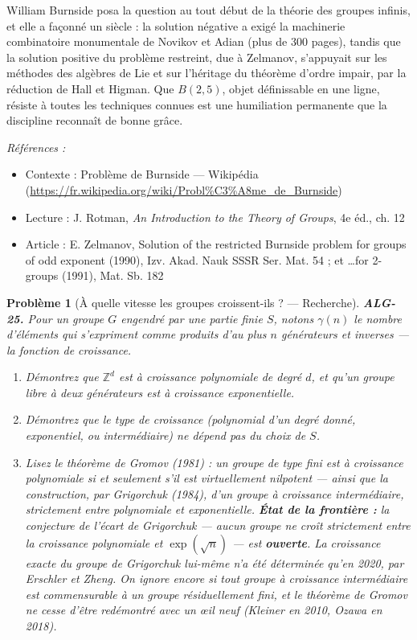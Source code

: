\documentclass[11pt]{article}
\newtheorem{problem}{Problème}
\newenvironment{refs}{\par\small\noindent\emph{Références :}\begin{itemize}\setlength\itemsep{0pt}}{\end{itemize}\normalsize}
\begin{document}
\noindent William Burnside posa la question au tout début de la théorie des groupes infinis, et
elle a façonné un siècle : la solution négative a exigé la machinerie combinatoire monumentale de Novikov et
Adian (plus de 300 pages), tandis que la solution positive du problème restreint, due à Zelmanov, s'appuyait
sur les méthodes des algèbres de Lie et sur l'héritage du théorème d'ordre impair, par la réduction de Hall
et Higman. Que $B(2,5)$, objet définissable en une ligne, résiste à toutes les techniques connues est une
humiliation permanente que la discipline reconnaît de bonne grâce.

\begin{refs}
\item Contexte : Problème de Burnside --- Wikipédia (\url{https://fr.wikipedia.org/wiki/Probl%C3%A8me_de_Burnside})
\item Lecture : J. Rotman, \textit{An Introduction to the Theory of Groups}, 4e éd., ch. 12
\item Article : E. Zelmanov, \og{} Solution of the restricted Burnside problem for groups of odd exponent \fg{} (1990), Izv. Akad. Nauk SSSR Ser. Mat. 54 ; et \og{} \dots{}for 2-groups \fg{} (1991), Mat. Sb. 182
\end{refs}

\bigskip

\begin{problem}[{À quelle vitesse les groupes croissent-ils ? --- Recherche}]
\textbf{ALG-25.} Pour un groupe $G$ engendré par une partie finie $S$, notons
$\gamma(n)$ le nombre d'éléments qui s'expriment comme produits d'au plus $n$ générateurs et
inverses --- la \textit{fonction de croissance}.
\begin{enumerate}
\item[(i)] Démontrez que $\mathbb{Z}^d$ est à croissance polynomiale
de degré $d$, et qu'un groupe libre à deux générateurs est à croissance exponentielle.
\item[(ii)] Démontrez que
le type de croissance (polynomial d'un degré donné, exponentiel, ou intermédiaire) ne dépend pas du
choix de $S$.
\item[(iii)] Lisez le théorème de Gromov (1981) : un groupe de type fini est à croissance
polynomiale si et seulement s'il est virtuellement nilpotent --- ainsi que la construction, par Grigorchuk
(1984), d'un groupe à croissance \textit{intermédiaire}, strictement entre polynomiale et exponentielle.
\textbf{État de la frontière :} la conjecture de l'écart de Grigorchuk --- aucun groupe ne croît strictement
entre la croissance polynomiale et $\exp(\sqrt{n})$ --- est \textbf{ouverte}. La croissance exacte du groupe
de Grigorchuk lui-même n'a été déterminée qu'en 2020, par Erschler et Zheng. On ignore encore
si tout groupe à croissance intermédiaire est commensurable à un groupe résiduellement
fini, et le théorème de Gromov ne cesse d'être redémontré avec un \oe{}il neuf (Kleiner en 2010, Ozawa en 2018).
\end{enumerate}

\end{problem}
\end{document}
